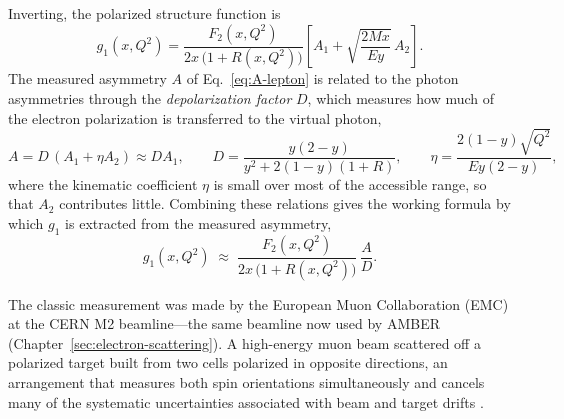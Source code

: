 Inverting, the polarized structure function is
\begin{equation}
    g_{1}(x,Q^{2}) = \frac{F_{2}(x,Q^{2})}{2x\,\bigl(1 + R(x,Q^{2})\bigr)}
        \left[A_{1} + \sqrt{\frac{2Mx}{Ey}}\,A_{2}\right].
    \label{eq:g1-from-A}
\end{equation}
The measured asymmetry $A$ of Eq.~\eqref{eq:A-lepton} is related to the photon
asymmetries through the \emph{depolarization factor} $D$, which measures how much of the
electron polarization is transferred to the virtual photon,
\begin{equation}
    A = D\,(A_{1} + \eta A_{2}) \approx D A_{1},
    \qquad
    D = \frac{y(2-y)}{y^{2} + 2(1-y)(1+R)},
    \qquad
    \eta = \frac{2(1-y)\sqrt{Q^{2}}}{Ey(2-y)},
    \label{eq:depolarization}
\end{equation}
where the kinematic coefficient $\eta$ is small over most of the accessible range, so
that $A_{2}$ contributes little. Combining these relations gives the working formula by
which $g_{1}$ is extracted from the measured asymmetry,
\begin{equation}
    g_{1}(x,Q^{2}) \;\approx\; \frac{F_{2}(x,Q^{2})}{2x\,\bigl(1 + R(x,Q^{2})\bigr)}\,
    \frac{A}{D}.
    \label{eq:g1-working}
\end{equation}

The classic measurement was made by the European Muon Collaboration (EMC) at the CERN M2
beamline---the same beamline now used by AMBER (Chapter~\ref{sec:electron-scattering}).
A high-energy muon beam scattered off a polarized target built from two cells polarized
in opposite directions, an arrangement that measures both spin orientations
simultaneously and cancels many of the systematic uncertainties associated with beam and
target drifts \cite[Ch.~1]{Amsler2018}.

